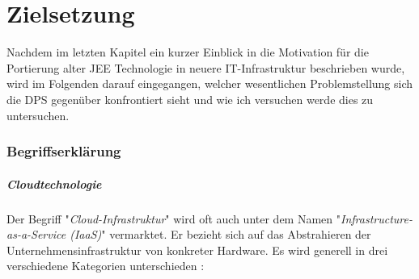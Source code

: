 \chapter{Zielsetzung \checkmark}

Nachdem im letzten Kapitel ein kurzer Einblick in die Motivation für die Portierung alter JEE Technologie in neuere IT-Infrastruktur beschrieben wurde, wird im Folgenden darauf eingegangen, welcher wesentlichen Problemstellung sich die DPS gegenüber konfrontiert sieht und wie ich versuchen werde dies zu untersuchen.


\subsection{Begriffserklärung \checkmark}

\paragraph{Cloudtechnologie}
Der Begriff "\emph{Cloud-Infrastruktur}" wird oft auch unter dem Namen "\emph{Infrastructure-as-a-Service (IaaS)}" vermarktet. Er bezieht sich auf das Abstrahieren der Unternehmensinfrastruktur von konkreter Hardware. Es wird generell in drei verschiedene Kategorien unterschieden \cite[Seite~54]{continuous-delivery}:

